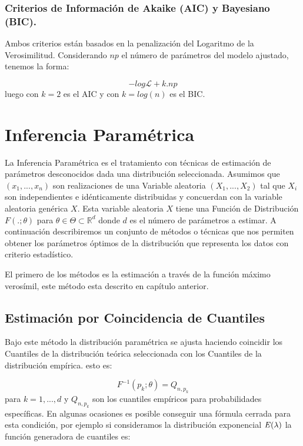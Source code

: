 \documentclass[]{article}
\begin{document}
\hypertarget{criterios-de-informacion-de-akaike-aic-y-bayesiano-bic.}{%
\subsubsection{Criterios de Información de Akaike (AIC) y Bayesiano
(BIC).}\label{criterios-de-informacion-de-akaike-aic-y-bayesiano-bic.}}

Ambos criterios están basados en la penalización del Logaritmo de la
Verosimilitud. Considerando \(np\) el número de parámetros del modelo
ajustado, tenemos la forma:

\[-log\mathcal{L} + k.np\] luego con \(k=2\) es el AIC y con
\(k=log(n)\) es el BIC.

\hypertarget{inferencia-parametrica}{%
\section{Inferencia Paramétrica}\label{inferencia-parametrica}}

La Inferencia Paramétrica es el tratamiento con técnicas de estimación
de parámetros desconocidos dada una distribución seleccionada. Asumimos
que \((x_1, ..., x_n)\) son realizaciones de una Variable aleatoria
\((X_1, ...,X_2)\) tal que \(X_i\) son independientes e idénticamente
distribuidas y concuerdan con la variable aleatoria genérica \(X\). Esta
variable aleatoria \(X\) tiene una Función de Distribución
\(F(.;\theta)\) para \(\theta \in \Theta \subset \mathbb{R}^d\) donde
\(d\) es el número de parámetros a estimar. A continuación describiremos
un conjunto de métodos o técnicas que nos permiten obtener los
parámetros óptimos de la distribución que representa los datos con
criterio estadístico.

El primero de los métodos es la estimación a través de la función máximo
verosímil, este método esta descrito en capítulo anterior.

\hypertarget{estimacion-por-coincidencia-de-cuantiles}{%
\subsection{Estimación por Coincidencia de
Cuantiles}\label{estimacion-por-coincidencia-de-cuantiles}}

Bajo este método la distribución paramétrica se ajusta haciendo
coincidir los Cuantiles de la distribución teórica seleccionada con los
Cuantiles de la distribución empírica. esto es:

\[F^{-1}(p_k;\theta)=Q_{n,p_k}\] para \(k=1, ...,d\) y \(Q_{n,p_{k}}\)
son los cuantiles empíricos para probabilidades específicas. En algunas
ocasiones es posible conseguir una fórmula cerrada para esta condición,
por ejemplo si consideramos la distribución exponencial
\(\it{E}(\lambda)\) la función generadora de cuantiles es:
\end{document}
